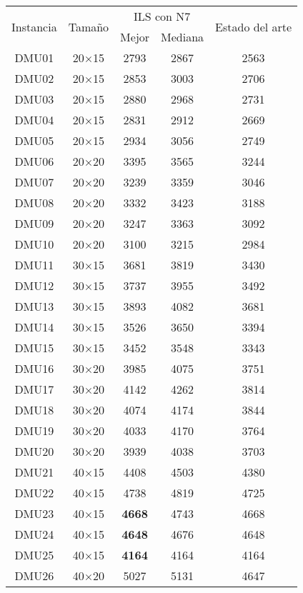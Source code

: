 \begin{table}[H]
\centering
\begin{tabular}{@{}ccccc@{}}
\toprule
\multirow{2}{*}{Instancia} & \multirow{2}{*}{Tamaño} & \multicolumn{2}{c}{ILS con N7} & \multirow{2}{*}{Estado del arte} \\ \cmidrule(lr){3-4}
& & Mejor& Mediana & \\ \midrule
DMU01 & 20$\times$15 & 2793 & 2867 & 2563\\ 
DMU02 & 20$\times$15 & 2853 & 3003 & 2706\\ 
DMU03 & 20$\times$15 & 2880 & 2968 & 2731\\ 
DMU04 & 20$\times$15 & 2831 & 2912 & 2669\\ 
DMU05 & 20$\times$15 & 2934 & 3056 & 2749\\ 
DMU06 & 20$\times$20 & 3395 & 3565 & 3244\\ 
DMU07 & 20$\times$20 & 3239 & 3359 & 3046\\ 
DMU08 & 20$\times$20 & 3332 & 3423 & 3188\\ 
DMU09 & 20$\times$20 & 3247 & 3363 & 3092\\ 
DMU10 & 20$\times$20 & 3100 & 3215 & 2984\\ 
DMU11 & 30$\times$15 & 3681 & 3819 & 3430\\ 
DMU12 & 30$\times$15 & 3737 & 3955 & 3492\\ 
DMU13 & 30$\times$15 & 3893 & 4082 & 3681\\ 
DMU14 & 30$\times$15 & 3526 & 3650 & 3394\\ 
DMU15 & 30$\times$15 & 3452 & 3548 & 3343\\ 
DMU16 & 30$\times$20 & 3985 & 4075 & 3751\\ 
DMU17 & 30$\times$20 & 4142 & 4262 & 3814\\ 
DMU18 & 30$\times$20 & 4074 & 4174 & 3844\\ 
DMU19 & 30$\times$20 & 4033 & 4170 & 3764\\ 
DMU20 & 30$\times$20 & 3939 & 4038 & 3703\\ 
DMU21 & 40$\times$15 & 4408 & 4503 & 4380\\ 
DMU22 & 40$\times$15 & 4738 & 4819 & 4725\\ 
DMU23 & 40$\times$15 & \textbf{4668} & 4743 & 4668\\ 
DMU24 & 40$\times$15 & \textbf{4648} & 4676 & 4648\\ 
DMU25 & 40$\times$15 & \textbf{4164} & 4164 & 4164\\ 
DMU26 & 40$\times$20 & 5027 & 5131 & 4647\\ 

\end{tabular}
\end{table}
